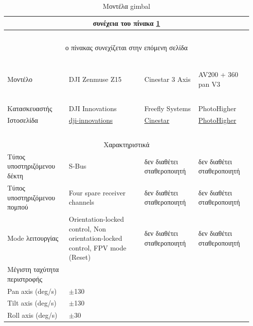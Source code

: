 \documentclass[a4paper, 12pt, twoside]{report}
\begin{document}
{{{{{{			\begin{landscape}	
			\setlength\LTleft{0pt}            %
			\setlength\LTright{0pt}           %
	
			\begin{longtable} { m{3cm} m{3.5cm} m{3.5cm} m{3.5cm}}
					\caption [Μοντέλα gimbal]{Μοντέλα gimbal}
					\label{πιν.:Μοντέλα gimbal}\\
					\hline
					\endfirsthead
					\multicolumn{4}{c}{συνέχεια του πίνακα \ref{πιν.:Μοντέλα gimbal}}\\
					\hline
					~\\
					\endhead
					\hline
					\multicolumn{4}{c}{ο πίνακας συνεχίζεται στην επόμενη σελίδα}\\
					\endfoot
					\multicolumn{4}{c}{ολοκληρώθηκε ο πίνακας \ref{πιν.:Μοντέλα gimbal}}\\
					\endlastfoot
					~\\
					Μοντέλο & DJI Zenmuse Z15 & Cinestar 3 Axis & AV200 + 360 pan V3\\
					\hline
					~\\
					Κατασκευαστής & DJI Innovations & Freefly Systems & PhotoHigher\\
					Ιστοσελίδα & \href{http://www.dji-innovations.com/products/zenmuse-z15/overview/}{dji-innovations} & \href{http://www.freeflysystems.com/products/cinestar-3-axis-gimbal.php}{Cinestar} & \href{http://photohigher.co.nz/products/camera-gimbals-and-kits/av200-pan-360-with-skids/}{PhotoHigher}\\
					\hline
					~\\
					\multicolumn{4}{c}{Χαρακτηριστικά}\\
					\hdashline
					Τύπος υποστηριζόμενου δέκτη & S-Bus  & δεν διαθέτει σταθεροποιητή & δεν διαθέτει σταθεροποιητή\\
					\hdashline
					Τύπος υποστηριζόμενου πομπού & Four spare receiver channels & δεν διαθέτει σταθεροποιητή & δεν διαθέτει σταθεροποιητή\\
					\hdashline
					Mode λειτουργίας & Orientation-locked control, Non orientation-locked control, FPV mode (Reset) & δεν διαθέτει σταθεροποιητή & δεν διαθέτει σταθεροποιητή\\
					\hdashline
					Μέγιστη ταχύτητα περιστροφής & & & \\
					Pan axis (deg/s) & $\pm$130 & & \\
					Tilt axis  (deg/s) & $\pm$130 & & \\
					Roll axis (deg/s) & $\pm$30 & & \\

\end{longtable}
\end{landscape}}}}}}}
\end{document}
